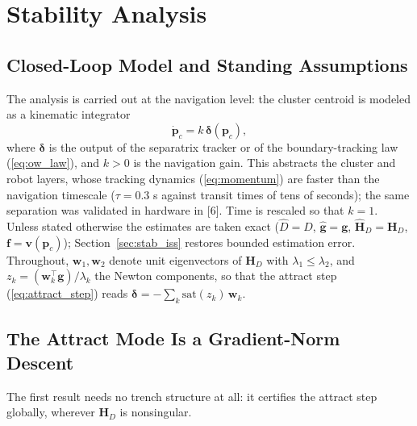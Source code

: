 \documentclass[lettersize,journal]{IEEEtran}
\begin{document}


\section{Stability Analysis}
\label{sec:stability}

\subsection{Closed-Loop Model and Standing Assumptions}

The analysis is carried out at the navigation level: the cluster
centroid is modeled as a kinematic integrator
\begin{equation}
    \dot{\mathbf{p}}_c = k\,\boldsymbol{\delta}(\mathbf{p}_c),
    \label{eq:kinematic_model}
\end{equation}
where $\boldsymbol{\delta}$ is the output of the separatrix tracker or
of the boundary-tracking law (\ref{eq:ow_law}), and $k > 0$ is the
navigation gain. This abstracts the cluster and robot layers, whose
tracking dynamics (\ref{eq:momentum}) are faster than the navigation
timescale ($\tau = 0.3$ s against transit times of tens of seconds);
the same separation was validated in hardware in [6]. Time is rescaled
so that $k = 1$. Unless stated otherwise the estimates are taken exact
($\hat{D} = D$, $\hat{\mathbf{g}} = \mathbf{g}$, $\hat{\mathbf{H}}_D =
\mathbf{H}_D$, $\mathbf{f} = \mathbf{v}(\mathbf{p}_c)$);
Section~\ref{sec:stab_iss} restores bounded estimation error.
Throughout, $\mathbf{w}_1, \mathbf{w}_2$ denote unit eigenvectors of
$\mathbf{H}_D$ with $\lambda_1 \leq \lambda_2$, and $z_k =
(\mathbf{w}_k^\top \mathbf{g})/\lambda_k$ the Newton components, so
that the attract step (\ref{eq:attract_step}) reads
$\boldsymbol{\delta} = -\sum_k \mathrm{sat}(z_k)\,\mathbf{w}_k$.

\subsection{The Attract Mode Is a Gradient-Norm Descent}

The first result needs no trench structure at all: it certifies the attract step
globally, wherever $\mathbf{H}_D$ is nonsingular.
\end{document}
